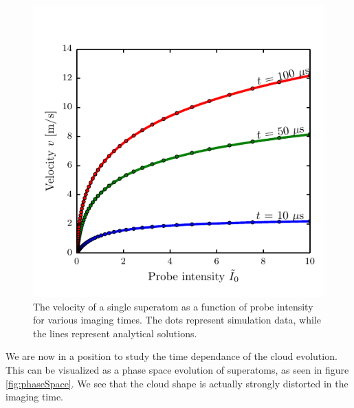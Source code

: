 \documentclass[12pt]{iopart}
\begin{document}
\begin{figure}
	\includegraphics[scale=0.57]{figure5}
\caption{The velocity of a single superatom as a function of probe intensity for various imaging times. The dots represent simulation data, while the lines represent analytical solutions.}  
\label{fig:oneAtomVel}
\end{figure}
\par We are now in a position to study the time dependance of the cloud evolution. This can be visualized as a phase space evolution of superatoms, as seen in figure \ref{fig:phaseSpace}. We see that the cloud shape is actually strongly distorted in the imaging time. 
\end{document}
